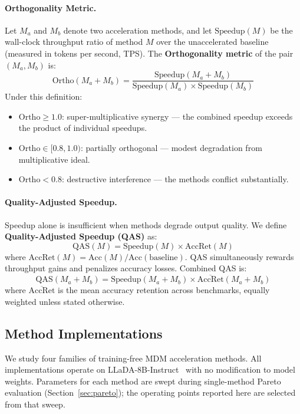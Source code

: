 \documentclass{article}
\newcommand{\ortho}{\text{Ortho}}
\newcommand{\qas}{\text{QAS}}
\newcommand{\speedup}{\text{Speedup}}
\newcommand{\accret}{\text{AccRet}}
\begin{document}
\paragraph{Orthogonality Metric.}
Let $M_a$ and $M_b$ denote two acceleration methods, and let $\speedup(M)$ be the wall-clock
throughput ratio of method $M$ over the unaccelerated baseline (measured in tokens per second, TPS).
The \textbf{Orthogonality metric} of the pair $(M_a, M_b)$ is:
\begin{equation}
  \ortho(M_a + M_b) = \frac{\speedup(M_a + M_b)}{\speedup(M_a) \times \speedup(M_b)}
\end{equation}
Under this definition:
\begin{itemize}
  \item $\ortho \geq 1.0$: super-multiplicative synergy --- the combined speedup exceeds the product
    of individual speedups.
  \item $\ortho \in [0.8, 1.0)$: partially orthogonal --- modest degradation from multiplicative
    ideal.
  \item $\ortho < 0.8$: destructive interference --- the methods conflict substantially.
\end{itemize}

\paragraph{Quality-Adjusted Speedup.}
Speedup alone is insufficient when methods degrade output quality. We define \textbf{Quality-Adjusted
Speedup (QAS)} as:
\begin{equation}
  \qas(M) = \speedup(M) \times \accret(M)
\end{equation}
where $\accret(M) = \text{Acc}(M) / \text{Acc}(\text{baseline})$. QAS simultaneously rewards
throughput gains and penalizes accuracy losses. Combined QAS is:
\begin{equation}
  \qas(M_a + M_b) = \speedup(M_a + M_b) \times \overline{\accret}(M_a + M_b)
\end{equation}
where $\overline{\accret}$ is the mean accuracy retention across benchmarks, equally weighted unless
stated otherwise.

\subsection{Method Implementations}
\label{sec:implementations}

We study four families of training-free MDM acceleration methods. All implementations operate on
LLaDA-8B-Instruct~\cite{llada} with no modification to model weights. Parameters for each method
are swept during single-method Pareto evaluation (Section~\ref{sec:pareto}); the operating points
reported here are selected from that sweep.
\end{document}
